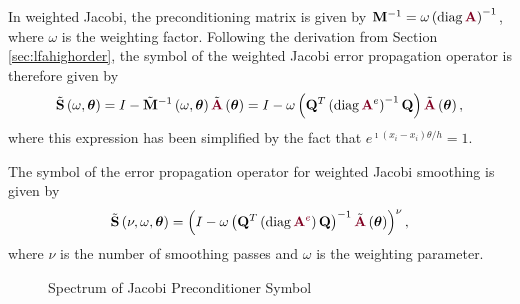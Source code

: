 In weighted Jacobi, the preconditioning matrix is given by $\mathbf{M}^{-1} = \omega \left( \diag {\color{burgundy}\mathbf{A}} \right)^{-1}$, where $\omega$ is the weighting factor.
Following the derivation from Section \ref{sec:lfahighorder}, the symbol of the weighted Jacobi error propagation operator is therefore given by
\begin{equation}
\tilde{\mathbf{S}} \left( \omega, \boldsymbol{\theta} \right) = I - \tilde{\mathbf{M}}^{-1} \left( \omega, \boldsymbol{\theta} \right) \tilde{{\color{burgundy}\mathbf{A}}} \left( \boldsymbol{\theta} \right) = I - \omega \left( \mathbf{Q}^T \left( \diag {\color{burgundy}\mathbf{A}}^e \right)^{-1} \mathbf{Q} \right) \tilde{{\color{burgundy}\mathbf{A}}} \left( \boldsymbol{\theta} \right),
\end{equation}
where this expression has been simplified by the fact that $e^{\imath \left( x_i - x_i \right) \theta / h} = 1$.

\begin{definition}
The symbol of the error propagation operator for weighted Jacobi smoothing is given by
\begin{equation}
\tilde{\mathbf{S}} \left( \nu, \omega, \boldsymbol{\theta} \right) = \left( I - \omega \left( \mathbf{Q}^T \left( \diag {\color{burgundy}\mathbf{A}^e} \right) \mathbf{Q} \right)^{-1} \tilde{{\color{burgundy}\mathbf{A}}} \left( \boldsymbol{\theta} \right) \right)^\nu,
\end{equation}
where $\nu$ is the number of smoothing passes and $\omega$ is the weighting parameter.
\label{def:jacobi_symbol}
\end{definition}

\begin{figure}[!ht]
  \centering
  \hfill
  \caption{Spectrum of Jacobi Preconditioner Symbol}
\end{figure}


